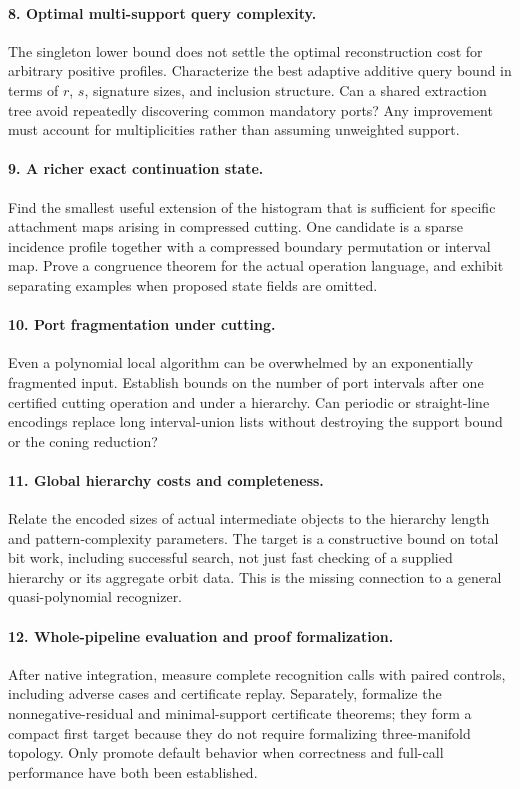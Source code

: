 \documentclass[11pt]{article}
\theoremstyle{definition}
\begin{document}
\paragraph{8. Optimal multi-support query complexity.}
The singleton lower bound does not settle the optimal reconstruction cost
for arbitrary positive profiles. Characterize the best adaptive additive
query bound in terms of $r$, $s$, signature sizes, and inclusion structure.
Can a shared extraction tree avoid repeatedly discovering common mandatory
ports? Any improvement must account for multiplicities rather than
assuming unweighted support.

\paragraph{9. A richer exact continuation state.}
Find the smallest useful extension of the histogram that is sufficient for
specific attachment maps arising in compressed cutting. One candidate is
a sparse incidence profile together with a compressed boundary permutation
or interval map. Prove a congruence theorem for the actual operation language,
and exhibit separating examples when proposed state fields are omitted.

\paragraph{10. Port fragmentation under cutting.}
Even a polynomial local algorithm can be overwhelmed by an exponentially
fragmented input. Establish bounds on the number of port intervals after
one certified cutting operation and under a hierarchy. Can periodic or
straight-line encodings replace long interval-union lists without destroying
the support bound or the coning reduction?

\paragraph{11. Global hierarchy costs and completeness.}
Relate the encoded sizes of actual intermediate objects to the hierarchy
length and pattern-complexity parameters. The target is a constructive
bound on total bit work, including successful search, not just fast checking
of a supplied hierarchy or its aggregate orbit data. This is the missing
connection to a general quasi-polynomial recognizer.

\paragraph{12. Whole-pipeline evaluation and proof formalization.}
After native integration, measure complete recognition calls with paired
controls, including adverse cases and certificate replay. Separately,
formalize the nonnegative-residual and minimal-support certificate theorems;
they form a compact first target because they do not require formalizing
three-manifold topology. Only promote default behavior when correctness
and full-call performance have both been established.
\end{document}
